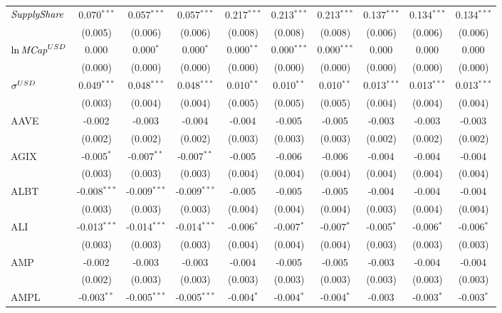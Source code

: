 \begin{table}[!htbp]
\begin{tabular}{@{\extracolsep{5pt}}lccccccccc}
 ${\it SupplyShare}$ & 0.070$^{***}$ & 0.057$^{***}$ & 0.057$^{***}$ & 0.217$^{***}$ & 0.213$^{***}$ & 0.213$^{***}$ & 0.137$^{***}$ & 0.134$^{***}$ & 0.134$^{***}$ \\
  & (0.005) & (0.006) & (0.006) & (0.008) & (0.008) & (0.008) & (0.006) & (0.006) & (0.006) \\
 ${\it \ln MCap}^{USD}$ & 0.000$^{}$ & 0.000$^{*}$ & 0.000$^{*}$ & 0.000$^{**}$ & 0.000$^{***}$ & 0.000$^{***}$ & 0.000$^{}$ & 0.000$^{}$ & 0.000$^{}$ \\
  & (0.000) & (0.000) & (0.000) & (0.000) & (0.000) & (0.000) & (0.000) & (0.000) & (0.000) \\
 ${\it \sigma}^{USD}$ & 0.049$^{***}$ & 0.048$^{***}$ & 0.048$^{***}$ & 0.010$^{**}$ & 0.010$^{**}$ & 0.010$^{**}$ & 0.013$^{***}$ & 0.013$^{***}$ & 0.013$^{***}$ \\
  & (0.003) & (0.004) & (0.004) & (0.005) & (0.005) & (0.005) & (0.004) & (0.004) & (0.004) \\
 AAVE & -0.002$^{}$ & -0.003$^{}$ & -0.004$^{}$ & -0.004$^{}$ & -0.005$^{}$ & -0.005$^{}$ & -0.003$^{}$ & -0.003$^{}$ & -0.003$^{}$ \\
  & (0.002) & (0.002) & (0.002) & (0.003) & (0.003) & (0.003) & (0.002) & (0.002) & (0.002) \\
 AGIX & -0.005$^{*}$ & -0.007$^{**}$ & -0.007$^{**}$ & -0.005$^{}$ & -0.006$^{}$ & -0.006$^{}$ & -0.004$^{}$ & -0.004$^{}$ & -0.004$^{}$ \\
  & (0.003) & (0.003) & (0.003) & (0.004) & (0.004) & (0.004) & (0.004) & (0.004) & (0.004) \\
 ALBT & -0.008$^{***}$ & -0.009$^{***}$ & -0.009$^{***}$ & -0.005$^{}$ & -0.005$^{}$ & -0.005$^{}$ & -0.004$^{}$ & -0.004$^{}$ & -0.004$^{}$ \\
  & (0.003) & (0.003) & (0.003) & (0.004) & (0.004) & (0.004) & (0.003) & (0.004) & (0.004) \\
 ALI & -0.013$^{***}$ & -0.014$^{***}$ & -0.014$^{***}$ & -0.006$^{*}$ & -0.007$^{*}$ & -0.007$^{*}$ & -0.005$^{*}$ & -0.006$^{*}$ & -0.006$^{*}$ \\
  & (0.003) & (0.003) & (0.003) & (0.004) & (0.004) & (0.004) & (0.003) & (0.003) & (0.003) \\
 AMP & -0.002$^{}$ & -0.003$^{}$ & -0.003$^{}$ & -0.004$^{}$ & -0.005$^{}$ & -0.005$^{}$ & -0.003$^{}$ & -0.004$^{}$ & -0.004$^{}$ \\
  & (0.002) & (0.003) & (0.003) & (0.003) & (0.003) & (0.003) & (0.003) & (0.003) & (0.003) \\
 AMPL & -0.003$^{**}$ & -0.005$^{***}$ & -0.005$^{***}$ & -0.004$^{*}$ & -0.004$^{*}$ & -0.004$^{*}$ & -0.003$^{}$ & -0.003$^{*}$ & -0.003$^{*}$ \\

\end{tabular}
\end{table}
